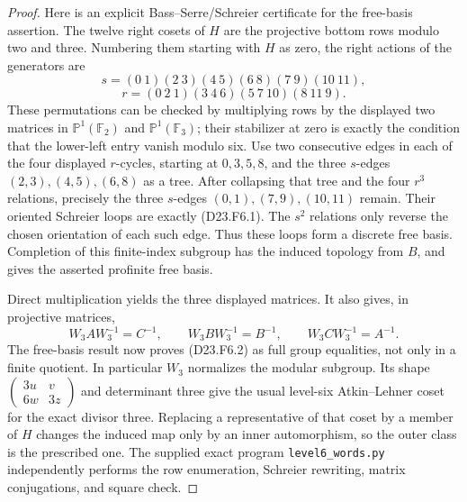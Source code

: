 \begin{proof}
Here is an explicit Bass--Serre/Schreier certificate for the
free-basis assertion.  The twelve right cosets of $H$ are
the projective bottom rows modulo two and three.  Numbering
them starting with $H$ as zero, the right actions of the
generators are
\[
 s=(0\ 1)(2\ 3)(4\ 5)(6\ 8)(7\ 9)(10\ 11),
\]
\[
 r=(0\ 2\ 1)(3\ 4\ 6)(5\ 7\ 10)(8\ 11\ 9).
\]
These permutations can be checked by multiplying rows by
the displayed two matrices in $\mathbb P^1(\mathbb F_2)$
and $\mathbb P^1(\mathbb F_3)$; their stabilizer at zero
is exactly the condition that the lower-left entry vanish
modulo six.  Use two consecutive edges in each of the four
displayed $r$-cycles, starting at $0,3,5,8$, and the three
$s$-edges $(2,3),(4,5),(6,8)$ as a tree.  After collapsing
that tree and the four $r^3$ relations, precisely the three
$s$-edges $(0,1),(7,9),(10,11)$ remain.  Their oriented
Schreier loops are exactly (D23.F6.1).  The $s^2$ relations
only reverse the chosen orientation of each such edge.
Thus these loops form a discrete free basis.  Completion of
this finite-index subgroup has the induced topology from
$B$, and gives the asserted profinite free basis.

Direct multiplication yields the three displayed matrices.
It also gives, in projective matrices,
\[
 W_3 A W_3^{-1}=C^{-1},\qquad
 W_3 B W_3^{-1}=B^{-1},\qquad
 W_3 C W_3^{-1}=A^{-1}.
\]
The free-basis result now proves (D23.F6.2) as full group
equalities, not only in a finite quotient.  In particular
$W_3$ normalizes the modular subgroup.  Its shape
$\left(\begin{smallmatrix}3u&v\\6w&3z\end{smallmatrix}\right)$
and determinant three give the usual level-six Atkin--Lehner
coset for the exact divisor three.  Replacing a representative
of that coset by a member of $H$ changes the induced map only
by an inner automorphism, so the outer class is the prescribed
one.  The supplied exact program \texttt{level6\_words.py}
independently performs the row enumeration, Schreier rewriting,
matrix conjugations, and square check.
\end{proof}

